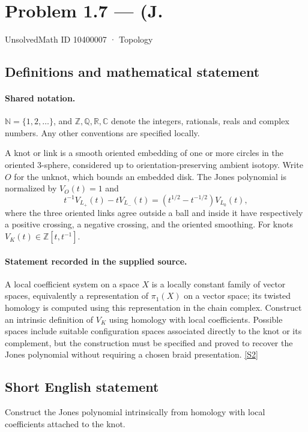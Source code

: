 \documentclass[11pt]{article}
\newcommand{\sref}[2]{\hyperlink{source:#1:#2}{[S#2]}}
\begin{document}
\setcounter{section}{10400006}
\section{Problem 1.7 — (J.}\label{10400007}
{\small\sffamily UnsolvedMath ID 10400007 · Topology}
\subsection{Definitions and mathematical statement}

\paragraph{Shared notation.}$\mathbb N=\{1,2,\ldots\}$, and $\mathbb Z,\mathbb Q,\mathbb R,\mathbb C$ denote the integers, rationals, reals and complex numbers. Any other conventions are specified locally.


A knot or link is a smooth oriented embedding of one or more circles in the oriented $3$-sphere, considered up to orientation-preserving ambient isotopy. Write $O$ for the unknot, which bounds an embedded disk. The Jones polynomial is normalized by $V_O(t)=1$ and
\[t^{-1}V_{L_+}(t)-tV_{L_-}(t)=(t^{1/2}-t^{-1/2})V_{L_0}(t),\]
where the three oriented links agree outside a ball and inside it have respectively a positive crossing, a negative crossing, and the oriented smoothing. For knots $V_K(t)\in\mathbb Z[t,t^{-1}]$.
\paragraph{Statement recorded in the supplied source.}
A local coefficient system on a space $X$ is a locally constant family of vector spaces, equivalently a representation of $\pi_1(X)$ on a vector space; its twisted homology is computed using this representation in the chain complex. Construct an intrinsic definition of $V_K$ using homology with local coefficients. Possible spaces include suitable configuration spaces associated directly to the knot or its complement, but the construction must be specified and proved to recover the Jones polynomial without requiring a chosen braid presentation. \sref{10400007}{2}
\subsection{Short English statement}
Construct the Jones polynomial intrinsically from homology with local coefficients attached to the knot.
\end{document}
